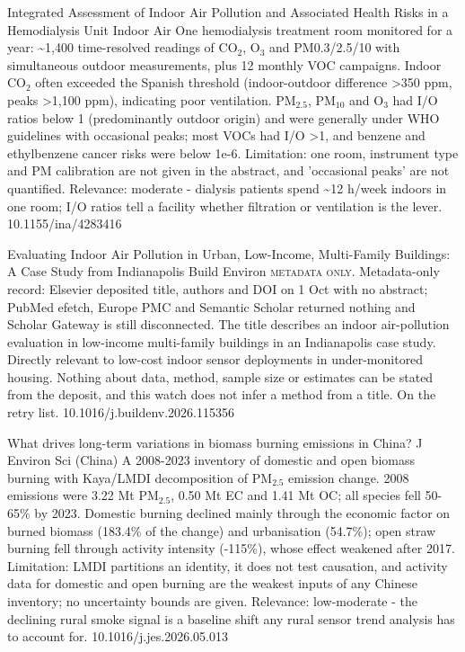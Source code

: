 \documentclass[10pt]{article}
\begin{document}
\par{}\baselineskip{}\baselineskip
{}

{Integrated Assessment of Indoor Air Pollution and Associated Health Risks in a Hemodialysis Unit}
{Indoor Air}
{One hemodialysis treatment room monitored for a year: \textasciitilde{}1,400 time-resolved readings of CO$_2$, O$_3$ and PM0.3/2.5/10 with simultaneous outdoor measurements, plus 12 monthly VOC campaigns. Indoor CO$_2$ often exceeded the Spanish threshold (indoor-outdoor difference >350 ppm, peaks >1,100 ppm), indicating poor ventilation. PM$_{2.5}$, PM$_{10}$ and O$_3$ had I/O ratios below 1 (predominantly outdoor origin) and were generally under WHO guidelines with occasional peaks; most VOCs had I/O >1, and benzene and ethylbenzene cancer risks were below 1e-6. Limitation: one room, instrument type and PM calibration are not given in the abstract, and 'occasional peaks' are not quantified. Relevance: moderate - dialysis patients spend \textasciitilde{}12 h/week indoors in one room; I/O ratios tell a facility whether filtration or ventilation is the lever.}
{10.1155/ina/4283416}

{Evaluating Indoor Air Pollution in Urban, Low-Income, Multi-Family Buildings: A Case Study from Indianapolis}
{Build Environ}
{\textsc{metadata only.} Metadata-only record: Elsevier deposited title, authors and DOI on 1 Oct with no abstract; PubMed efetch, Europe PMC and Semantic Scholar returned nothing and Scholar Gateway is still disconnected. The title describes an indoor air-pollution evaluation in low-income multi-family buildings in an Indianapolis case study. Directly relevant to low-cost indoor sensor deployments in under-monitored housing. Nothing about data, method, sample size or estimates can be stated from the deposit, and this watch does not infer a method from a title. On the retry list.}
{10.1016/j.buildenv.2026.115356}

\par{}\baselineskip{}\baselineskip
{}

{What drives long-term variations in biomass burning emissions in China?}
{J Environ Sci (China)}
{A 2008-2023 inventory of domestic and open biomass burning with Kaya/LMDI decomposition of PM$_{2.5}$ emission change. 2008 emissions were 3.22 Mt PM$_{2.5}$, 0.50 Mt EC and 1.41 Mt OC; all species fell 50-65\% by 2023. Domestic burning declined mainly through the economic factor on burned biomass (183.4\% of the change) and urbanisation (54.7\%); open straw burning fell through activity intensity (-115\%), whose effect weakened after 2017. Limitation: LMDI partitions an identity, it does not test causation, and activity data for domestic and open burning are the weakest inputs of any Chinese inventory; no uncertainty bounds are given. Relevance: low-moderate - the declining rural smoke signal is a baseline shift any rural sensor trend analysis has to account for.}
{10.1016/j.jes.2026.05.013}
\end{document}
